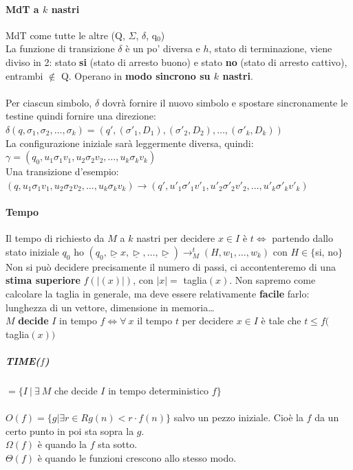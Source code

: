 \documentclass[10pt]{book}
\begin{document}
\paragraph{MdT a $k$ nastri} MdT come tutte le altre (Q, $\Sigma$, $\delta$, q$_0$)\\
La funzione di transizione $\delta$ è un po' diversa e $h$, stato di terminazione, viene diviso in 2: stato \textbf{si} (stato di arresto buono) e stato \textbf{no} (stato di arresto cattivo), entrambi $\not\in$ Q. Operano in \textbf{modo sincrono su $k$ nastri}.\\\\
Per ciascun simbolo, $\delta$ dovrà fornire il nuovo simbolo e spostare sincronamente le testine quindi fornire una direzione: 
$\delta(q, \sigma_1, \sigma_2, \ldots, \sigma_k) = (q', (\sigma'_1, D_1), (\sigma'_2, D_2), \ldots, (\sigma'_k, D_k))$\\
La configurazione iniziale sarà leggermente diversa, quindi: 
$\gamma = (q_0, u_1 \sigma_1 v_1, u_2 \sigma_2 v_2, \ldots, u_k \sigma_k v_k)$\\
Una transizione d'esempio: $(q, u_1\sigma_1 v_1, u_2\sigma_2 v_2, \ldots, u_k \sigma_k v_k) \rightarrow (q', u'_1\sigma'_1 v'_1, u'_2\sigma'_2 v'_2, \ldots, u'_k \sigma'_k v'_k)$\\
\pagebreak
\paragraph{Tempo} Il tempo di richiesto da $M$ a $k$ nastri per decidere $x \in I$ è $t \Leftrightarrow$ partendo dallo stato iniziale $q_0$ ho $(q_0, \underline{\triangleright}x, \underline{\triangleright}, \ldots, \underline{\triangleright}) \longrightarrow_M^t (H, w_1, \ldots, w_k)$ con $H \in \{$si, no$\}$\\
Non si può decidere precisamente il numero di passi, ci accontenteremo di una \textbf{stima superiore} $f(|(x)|)$, con $|x| =$ taglia$(x)$. Non sapremo come calcolare la taglia in generale, ma deve essere relativamente \textbf{facile} farlo: lunghezza di un vettore, dimensione in memoria\ldots\\
$M$ \textbf{decide} $I$ in tempo $f \Leftrightarrow \forall\: x$ il tempo $t$ per decidere $x \in I$ è tale che $t \leq f($taglia$(x))$
\subparagraph{TIME($f$)} $= \{I\:|\: \exists\: M$ che decide $I$ in tempo deterministico $f\}$\\\\
$O(f) = \{g | \exists r \in R  g(n) < r\cdot f(n)\}$ salvo un pezzo iniziale. Cioè la $f$ da un certo punto in poi sta sopra la $g$.\\$\Omega(f)$ è quando la $f$ sta sotto.\\$\Theta(f)$ è quando le funzioni crescono allo stesso modo.
\end{document}

